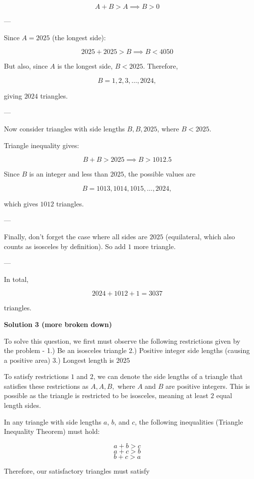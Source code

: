 \begin{enumerate}
 \[A + B > A \implies B > 0\]

 ---

 Since $A = 2025$ (the longest side):

 
 \[2025 + 2025 > B \implies B < 4050\]

 But also, since $A$ is the longest side, $B < 2025$. Therefore,

 
 \[B = 1, 2, 3, \ldots, 2024,\]

 giving $2024$ triangles.

 ---

 Now consider triangles with side lengths $B, B, 2025$, where $B < 2025$.

 Triangle inequality gives:

 
 \[B + B > 2025 \implies B > 1012.5\]

 Since $B$ is an integer and less than $2025$, the possible values are

 
 \[B = 1013, 1014, 1015, \ldots, 2024,\]

 which gives $1012$ triangles.

 ---

 Finally, don’t forget the case where all sides are $2025$ (equilateral, which also counts as isosceles by definition). So add $1$ more triangle.

 ---

 In total,

 
 \[2024 + 1012 + 1 = \boxed{3037}\]

 triangles.

 



\textbf{Solution 3 (more broken down)}

To solve this question, we first must observe the following restrictions given by the problem -  1.) Be an isosceles triangle  2.) Positive integer side lengths (causing a positive area)  3.) Longest length is $2025$ 

 To satisfy restrictions $1$ and $2$, we can denote the side lengths of a triangle that satisfies these restrictions as $A, A, B,$ where $A$ and $B$ are positive integers. This is possible as the triangle is restricted to be isosceles, meaning at least $2$ equal length sides.

 In any triangle with side lengths $a$, $b$, and $c$, the following inequalities (Triangle Inequality Theorem) must hold:

 
 \[a + b > c\] 
 \[a + c > b\] 
 \[b + c > a\]

 Therefore, our satisfactory triangles must satisfy


\end{enumerate}
